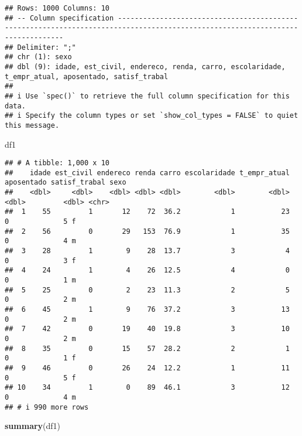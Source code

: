 \documentclass[
]{article}
\newenvironment{Shaded}{\begin{snugshade}}{\end{snugshade}}
\newcommand{\FunctionTok}[1]{\textcolor[rgb]{0.13,0.29,0.53}{\textbf{#1}}}
\newcommand{\NormalTok}[1]{#1}
\begin{document}
\begin{verbatim}
## Rows: 1000 Columns: 10
## -- Column specification -------------------------------------------------------------------------------------------------------------------------------
## Delimiter: ";"
## chr (1): sexo
## dbl (9): idade, est_civil, endereco, renda, carro, escolaridade, t_empr_atual, aposentado, satisf_trabal
## 
## i Use `spec()` to retrieve the full column specification for this data.
## i Specify the column types or set `show_col_types = FALSE` to quiet this message.
\end{verbatim}

\begin{Shaded}
\begin{Highlighting}[]
\NormalTok{df1}
\end{Highlighting}
\end{Shaded}

\begin{verbatim}
## # A tibble: 1,000 x 10
##    idade est_civil endereco renda carro escolaridade t_empr_atual aposentado satisf_trabal sexo 
##    <dbl>     <dbl>    <dbl> <dbl> <dbl>        <dbl>        <dbl>      <dbl>         <dbl> <chr>
##  1    55         1       12    72  36.2            1           23          0             5 f    
##  2    56         0       29   153  76.9            1           35          0             4 m    
##  3    28         1        9    28  13.7            3            4          0             3 f    
##  4    24         1        4    26  12.5            4            0          0             1 m    
##  5    25         0        2    23  11.3            2            5          0             2 m    
##  6    45         1        9    76  37.2            3           13          0             2 m    
##  7    42         0       19    40  19.8            3           10          0             2 m    
##  8    35         0       15    57  28.2            2            1          0             1 f    
##  9    46         0       26    24  12.2            1           11          0             5 f    
## 10    34         1        0    89  46.1            3           12          0             4 m    
## # i 990 more rows
\end{verbatim}

\begin{Shaded}
\begin{Highlighting}[]
\FunctionTok{summary}\NormalTok{(df1)}
\end{Highlighting}
\end{Shaded}
\end{document}
